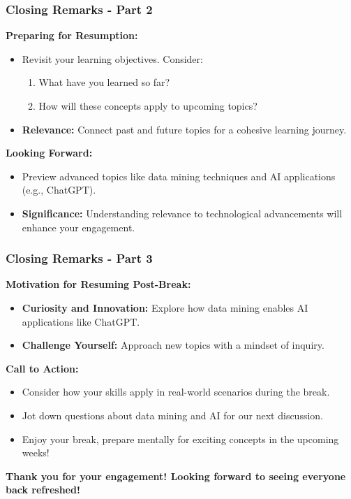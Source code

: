 \documentclass[aspectratio=169]{beamer}
\begin{document}
\begin{frame}[fragile]
    \frametitle{Closing Remarks - Part 2}
    
    \textbf{Preparing for Resumption:}
    \begin{itemize}
        \item Revisit your learning objectives. Consider:
        \begin{enumerate}
            \item What have you learned so far?
            \item How will these concepts apply to upcoming topics?
        \end{enumerate}
        \item \textbf{Relevance:} Connect past and future topics for a cohesive learning journey.
    \end{itemize}
    
    \textbf{Looking Forward:}
    \begin{itemize}
        \item Preview advanced topics like data mining techniques and AI applications (e.g., ChatGPT).
        \item \textbf{Significance:} Understanding relevance to technological advancements will enhance your engagement.
    \end{itemize}
\end{frame}

\begin{frame}[fragile]
    \frametitle{Closing Remarks - Part 3}
    
    \textbf{Motivation for Resuming Post-Break:}
    \begin{itemize}
        \item \textbf{Curiosity and Innovation:} Explore how data mining enables AI applications like ChatGPT.
        \item \textbf{Challenge Yourself:} Approach new topics with a mindset of inquiry. 
    \end{itemize}
    
    \textbf{Call to Action:}
    \begin{itemize}
        \item Consider how your skills apply in real-world scenarios during the break.
        \item Jot down questions about data mining and AI for our next discussion.
        \item Enjoy your break, prepare mentally for exciting concepts in the upcoming weeks!
    \end{itemize}
    
    \textbf{Thank you for your engagement! Looking forward to seeing everyone back refreshed!}
\end{frame}
\end{document}
